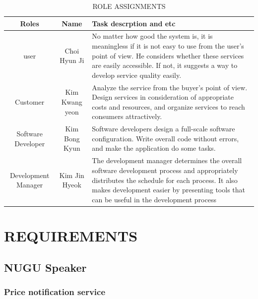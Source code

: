 \documentclass[conference]{IEEEtran}
\begin{document}
\begin{table}[!htbp]
\caption{ROLE ASSIGNMENTS}
\begin{tabular}{|c|c|p{2.5cm}|}
\hline
Roles& Name & Task descrption and etc\\
\hline 
user&Choi Hyun Ji & No matter how good the system is, it is meaningless if it is not easy to use from the user's point of view. He considers whether these services are easily accessible. If not, it suggests a way to develop service quality easily.\\
\hline
Customer& Kim Kwang yeon &Analyze the service from the buyer's point of view. Design services in consideration of appropriate costs and resources, and organize services to reach consumers attractively. \\
\hline
Software Developer & Kim Bong Kyun & Software developers design a full-scale software configuration. Write overall code without errors, and make the application do some tasks.\\
\hline
Development Manager& Kim Jin Hyeok & The development manager determines the overall software development process and appropriately distributes the schedule for each process. It also makes development easier by presenting tools that can be useful in the development process\\
\hline
\end{tabular}
\end{table}

\section{REQUIREMENTS}
\subsection{NUGU Speaker }\label{AA}
\subsubsection{Price notification service}
\end{document}
